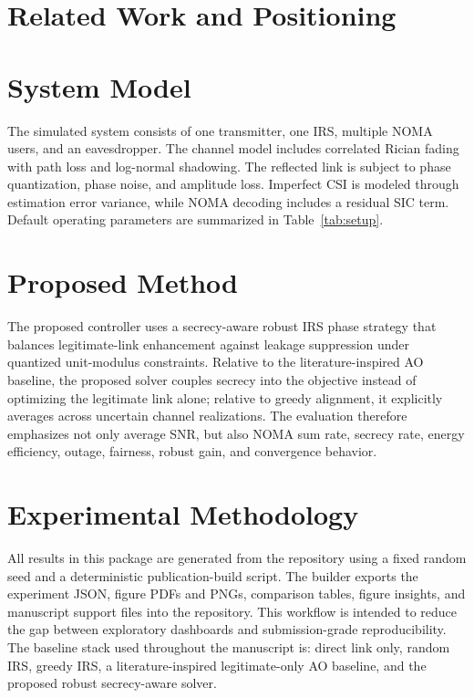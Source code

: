 \documentclass[journal]{IEEEtran}
\begin{document}
\section{Related Work and Positioning}


\section{System Model}
The simulated system consists of one transmitter, one IRS, multiple NOMA users, and an eavesdropper. The channel model includes correlated Rician fading with path loss and log-normal shadowing. The reflected link is subject to phase quantization, phase noise, and amplitude loss. Imperfect CSI is modeled through estimation error variance, while NOMA decoding includes a residual SIC term. Default operating parameters are summarized in Table~\ref{tab:setup}.





\section{Proposed Method}
The proposed controller uses a secrecy-aware robust IRS phase strategy that balances legitimate-link enhancement against leakage suppression under quantized unit-modulus constraints. Relative to the literature-inspired AO baseline, the proposed solver couples secrecy into the objective instead of optimizing the legitimate link alone; relative to greedy alignment, it explicitly averages across uncertain channel realizations. The evaluation therefore emphasizes not only average SNR, but also NOMA sum rate, secrecy rate, energy efficiency, outage, fairness, robust gain, and convergence behavior.







\section{Experimental Methodology}
All results in this package are generated from the repository using a fixed random seed and a deterministic publication-build script. The builder exports the experiment JSON, figure PDFs and PNGs, comparison tables, figure insights, and manuscript support files into the repository. This workflow is intended to reduce the gap between exploratory dashboards and submission-grade reproducibility. The baseline stack used throughout the manuscript is: direct link only, random IRS, greedy IRS, a literature-inspired legitimate-only AO baseline, and the proposed robust secrecy-aware solver.
\end{document}
